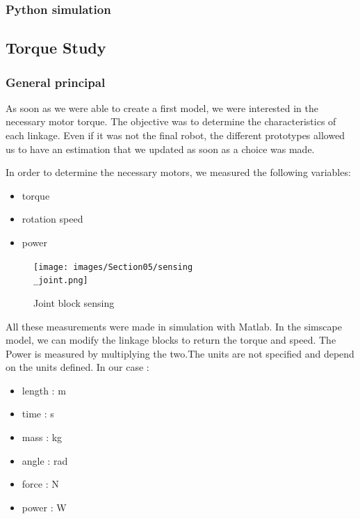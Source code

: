\subsubsection{Python simulation}

\subsection{Torque Study}
\subsubsection{General principal}

As soon as we were able to create a first model, we were interested in the necessary motor torque. The objective was to determine the characteristics of each linkage. Even if it was not the final robot, the different prototypes allowed us to have an estimation that we updated as soon as a choice was made. 

\bigbreak
In order to determine the necessary motors, we measured the following variables:
\begin{multicols}{3}
    \begin{itemize}[noitemsep]
        \item torque
        \item rotation speed
        \item power
    \end{itemize}
\end{multicols}

\bigbreak
\begin{figure}[ht]
    \centering
    \texttt{[image: images/Section05/sensing\\\_joint.png]}
    \caption{Joint block sensing}
    \label{fig:mesh15}
\end{figure}
\FloatBarrier

\bigbreak
All these measurements were made in simulation with Matlab. In the simscape model, we can modify the linkage blocks to return the torque and speed. The Power is measured by multiplying the two.The units are not specified and depend on the units defined. In our case : 
\begin{multicols}{2}
    \begin{itemize}[noitemsep]
        \item length : m
        \item time : s
        \item mass : kg
        \item angle : rad
        \item force : N
        \item power : W
    \end{itemize}
\end{multicols}

